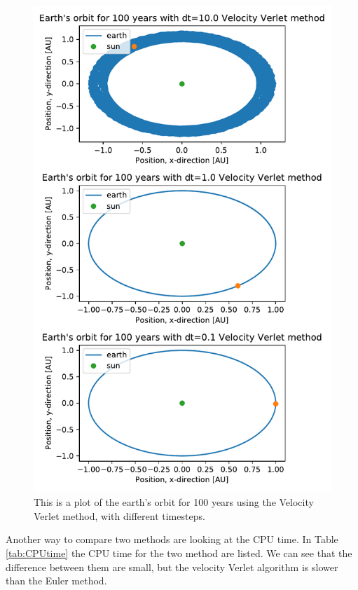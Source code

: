 \begin{figure}[H]
\includegraphics[width=1.1\linewidth]{../results/plots/different_timesteps_Velocity Verlet method.pdf}\caption{This is a plot of the earth's orbit for 100 years using the Velocity Verlet method, with different timesteps.}\label{fig:timesteps-verlet}
\end{figure}		

Another way to compare two methods are looking at the CPU time. In Table \ref{tab:CPUtime} the CPU time for the two method are listed. We can see that the difference between them are small, but the velocity Verlet algorithm is slower than the Euler method. 



